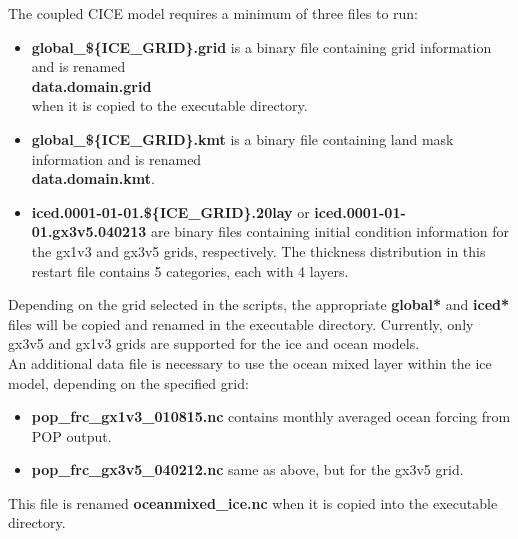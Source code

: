 
The coupled CICE model requires a minimum of three files to run:

\begin{itemize}
  \item {\bf global\_\$\{ICE\_GRID\}.grid} is a binary file containing
        grid information and is renamed  \\
        {\bf data.domain.grid}  \\
        when it is copied to the executable directory.
  \item {\bf global\_\$\{ICE\_GRID\}.kmt} is a binary file containing
        land mask information and is renamed \\
        {\bf data.domain.kmt}.
  \item {\bf iced.0001-01-01.\$\{ICE\_GRID\}.20lay} or 
        {\bf iced.0001-01-01.gx3v5.040213} are binary files containing
         initial condition information for the gx1v3 and gx3v5 grids,
         respectively. The thickness distribution in this
         restart file contains 5 categories, each with 4 layers.
\end{itemize}

Depending on the grid selected in the scripts, the appropriate {\bf global*}
and {\bf iced*} files will be copied and renamed in the executable directory.
Currently, only gx3v5 and gx1v3 grids are supported for the ice and ocean
models.\\

An additional data file is necessary to use the ocean mixed layer within the
ice model, depending on the specified grid:
\begin{itemize}
  \item {\bf pop\_frc\_gx1v3\_010815.nc} contains monthly averaged ocean forcing
        from POP output.
  \item {\bf pop\_frc\_gx3v5\_040212.nc} same as above, but for the gx3v5 grid.
\end{itemize}

This file is renamed {\bf oceanmixed\_ice.nc} when it is copied into the executable
directory.

